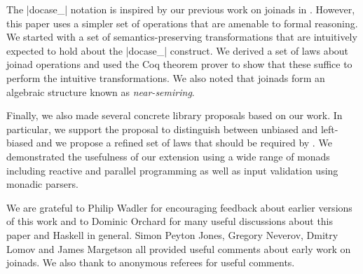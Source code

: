 \documentclass{sigplanconf}
\begin{document}
The |docase_| notation is inspired by our previous work on joinads in \fsharp. However, this paper
uses a simpler set of operations that are amenable to formal reasoning. We started with a set of 
semantics-preserving transformations that are intuitively expected to hold about the |docase_| construct. We 
derived a set of laws about joinad operations and used the Coq theorem prover to show that these 
suffice to perform the intuitive transformations. We also noted that joinads form an algebraic 
structure known as \textit{near-semiring}.

Finally, we also made several concrete library proposals based on our work. In particular, we support
the proposal to distinguish between unbiased  and left-biased  and we
propose a refined set of laws that should be required by . We demonstrated the
usefulness of our extension using a wide range of monads including reactive and parallel programming
as well as input validation using monadic parsers. 


\acks
We are grateful to Philip Wadler for encouraging feedback about earlier versions of this work and to 
Dominic Orchard for many useful discussions about this paper and Haskell in general. Simon Peyton 
Jones, Gregory Neverov, Dmitry Lomov and James Margetson all provided useful comments about early 
work on joinads. We also thank to anonymous referees for useful comments.


\end{document}
